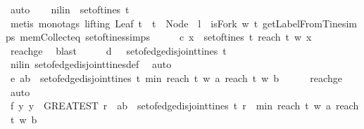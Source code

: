 \begin{isabellebody}
\ auto\isanewline
\ \ \isamarkupfalse%
\ nilin{\isacharcolon}{\isachardoublequoteopen}{\isacharbrackleft}{\isacharbrackright}\ {\isasymin}\ set{\isacharunderscore}of{\isacharunderscore}tines\ t{\isachardoublequoteclose}\isanewline
{}\isamarkupfalse%
\ {\isacharparenleft}metis\ {\isacharparenleft}mono{\isacharunderscore}tags{\isacharcomma}\ lifting{\isacharparenright}\ {\isacartoucheopen}Leaf\ t\ {\isasymand}\ t\ {\isacharequal}\ Node\ {}\ l\ {\isasymand}\ isFork\ w\ t{\isacartoucheclose}\ getLabelFromTine{\isachardot}simps{\isacharparenleft}{}{\isacharparenright}\ mem{\isacharunderscore}Collect{\isacharunderscore}eq\ set{\isacharunderscore}of{\isacharunderscore}tines{\isachardot}simps{\isacharparenright}\isanewline
\ \ \isamarkupfalse%
\ \isamarkupfalse%
\ c{\isacharcolon}{\isachardoublequoteopen}{\isasymexists}\ x\ {\isasymin}\ set{\isacharunderscore}of{\isacharunderscore}tines\ t{\isachardot}\ reach\ t\ w\ x\ {\isasymge}\ {}{\isachardoublequoteclose}\isanewline
\ \ \ \ \isamarkupfalse%
\ reachge{}\ \isamarkupfalse%
\ blast\isanewline
\ \ \isamarkupfalse%
\ \isamarkupfalse%
\ d{\isacharcolon}\ {\isachardoublequoteopen}{\isacharparenleft}{\isacharbrackleft}{\isacharbrackright}{\isacharcomma}{\isacharbrackleft}{\isacharbrackright}{\isacharparenright}\ {\isasymin}\ set{\isacharunderscore}of{\isacharunderscore}edge{\isacharunderscore}disjoint{\isacharunderscore}tines\ t{\isachardoublequoteclose}\ \isanewline
\ \ \ \ \isamarkupfalse%
\ nilin\ set{\isacharunderscore}of{\isacharunderscore}edge{\isacharunderscore}disjoint{\isacharunderscore}tines{\isacharunderscore}def\ \isamarkupfalse%
\ auto\isanewline
\ \ \isamarkupfalse%
\ \isamarkupfalse%
\ e{\isacharcolon}{\isachardoublequoteopen}{\isasymexists}\ {\isacharparenleft}a{\isacharcomma}b{\isacharparenright}\ {\isasymin}\ set{\isacharunderscore}of{\isacharunderscore}edge{\isacharunderscore}disjoint{\isacharunderscore}tines\ t{\isachardot}\ min\ {\isacharparenleft}reach\ t\ w\ a{\isacharparenright}\ {\isacharparenleft}reach\ t\ w\ b{\isacharparenright}{\isasymge}{}{\isachardoublequoteclose}\isanewline
\ \ \ \ \isamarkupfalse%
\ reachge{}\ \isamarkupfalse%
\ auto\isanewline
\ \ \isamarkupfalse%
\ \isamarkupfalse%
\ f{\isacharcolon}{\isachardoublequoteopen}{\isasymexists}\ y{\isachardot}\ y\ {\isacharequal}\ {\isacharparenleft}GREATEST\ r{\isachardot}\ {\isacharparenleft}{\isasymexists}\ {\isacharparenleft}a{\isacharcomma}b{\isacharparenright}\ {\isasymin}\ set{\isacharunderscore}of{\isacharunderscore}edge{\isacharunderscore}disjoint{\isacharunderscore}tines\ t{\isachardot}\ r\ {\isacharequal}\ min\ {\isacharparenleft}reach\ t\ w\ a{\isacharparenright}\ {\isacharparenleft}reach\ t\ w\ b{\isacharparenright}{\isacharparenright}{\isacharparenright}{\isachardoublequoteclose}\isanewline

\end{isabellebody}
